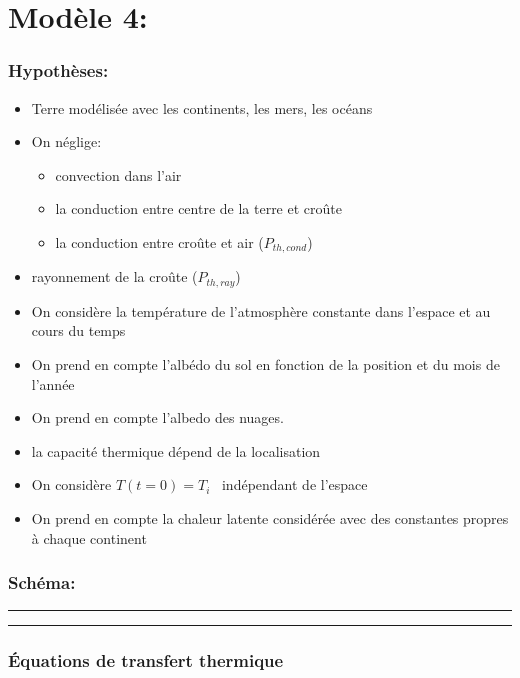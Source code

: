 \documentclass[a4paper,12pt]{article}
\begin{document}
\section*{Modèle 4: }
\subsubsection*{Hypothèses:}
\begin{itemize}
    \item Terre modélisée avec les continents, les mers, les océans 
    \item  On néglige: 
    \begin{itemize}
        \item convection dans l'air
        \item la conduction entre centre de la terre et croûte
        \item la conduction entre croûte et air (\(P_{th,cond}\))
    \end{itemize} 
    \item  rayonnement de la croûte (\(P_{th,ray}\))
    \item On considère la température de l'atmosphère constante dans l'espace et  au cours du temps 
    \item On prend en compte l'albédo du sol en fonction de la position et du mois de l'année 
    \item On prend en compte l'albedo des nuages.
    \item la capacité thermique dépend de la localisation
    \item On considère $T(t=0) = T_i$ \  indépendant de l'espace  
    \item On prend en compte la chaleur latente considérée avec des constantes propres à chaque continent\\
    
    
    
    
\end{itemize}

\subsubsection*{Schéma:} 
\noindent\textcolor{gray}{\rule{\linewidth}{0.4pt}}

    
\begin{center}
  
\end{center}
\noindent\textcolor{gray}{\rule{\linewidth}{0.4pt}}
\vspace{0.2cm}
\subsubsection*{Équations de transfert thermique}
\end{document}
